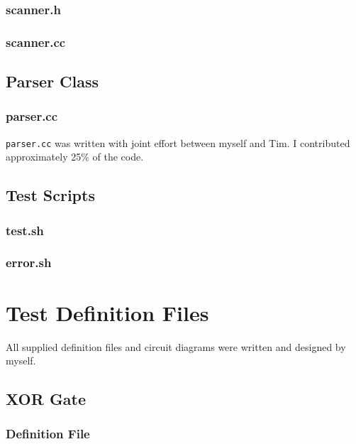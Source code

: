 \documentclass[a4paper,10pt]{article}
\begin{document}
\subsubsection{scanner.h}

\subsubsection{scanner.cc}


\subsection{Parser Class}
\subsubsection{parser.cc}


\texttt{parser.cc} was written with joint effort between myself and Tim. I contributed approximately 25\% of the code.

\subsection{Test Scripts}
\label{sec:tests}
\subsubsection{test.sh}

\subsubsection{error.sh}

\pagebreak

\section{Test Definition Files}
\label{sec:examples}

All supplied definition files and circuit diagrams were written and designed by myself.

\subsection{XOR Gate}

\subsubsection{Definition File}

\end{document}
